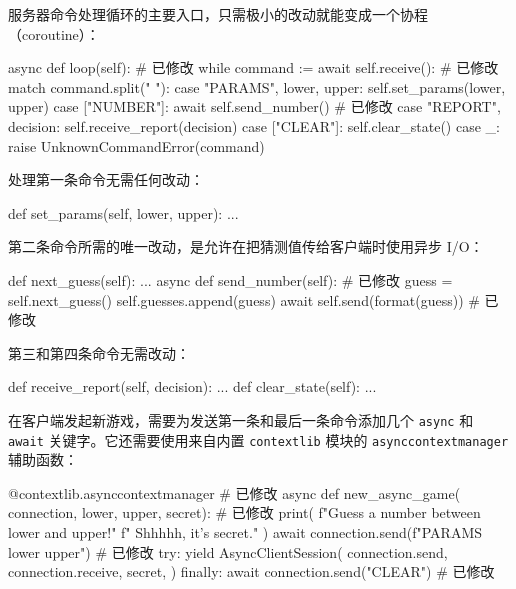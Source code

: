服务器命令处理循环的主要入口，只需极小的改动就能变成一个协程（coroutine）：

\begin{codebox}[python]
    async def loop(self):                       # 已修改
        while command := await self.receive():  # 已修改
            match command.split(" "):
                case "PARAMS", lower, upper:
                    self.set_params(lower, upper)
                case ["NUMBER"]:
                    await self.send_number()    # 已修改
                case "REPORT", decision:
                    self.receive_report(decision)
                case ["CLEAR"]:
                    self.clear_state()
                case _:
                    raise UnknownCommandError(command)
\end{codebox}

处理第一条命令无需任何改动：

\begin{codebox}[python]
    def set_params(self, lower, upper):
        ...
\end{codebox}

第二条命令所需的唯一改动，是允许在把猜测值传给客户端时使用异步 I/O：

\begin{codebox}[python]
    def next_guess(self):
        ...
    async def send_number(self):                    # 已修改
        guess = self.next_guess()
        self.guesses.append(guess)
        await self.send(format(guess))              # 已修改
\end{codebox}

第三和第四条命令无需改动：

\begin{codebox}[python]
    def receive_report(self, decision):
        ...
    def clear_state(self):
        ...
\end{codebox}

在客户端发起新游戏，需要为发送第一条和最后一条命令添加几个 \texttt{async} 和 \texttt{await} 关键字。它还需要使用来自内置 \texttt{contextlib} 模块的 \texttt{asynccontextmanager} 辅助函数：

\begin{codebox}[python]
@contextlib.asynccontextmanager                       # 已修改
async def new_async_game(
    connection, lower, upper, secret):                # 已修改
    print(
        f"Guess a number between {lower} and {upper}!"
        f" Shhhhh, it's {secret}."
    )
    await connection.send(f"PARAMS {lower} {upper}")   # 已修改
    try:
        yield AsyncClientSession(
            connection.send,
            connection.receive,
            secret,
        )
    finally:
        await connection.send("CLEAR")                # 已修改
\end{codebox}


